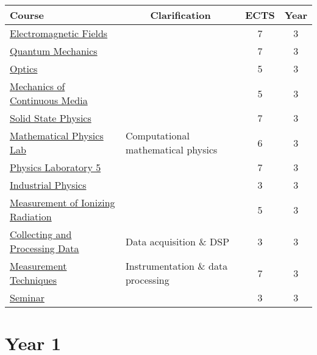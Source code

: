 \documentclass[11pt, a4paper]{article}
\begin{document}
\begin{table}[htb!]
\begin{tabular}{|l|l|c|c|}
    \hline {\rule{0pt}{2.0ex}} \hspace{-7pt}
    \textbf{Course} & \multicolumn{1}{c}{\textbf{Clarification}} & \textbf{ECTS} & \textbf{Year}\\
    \hline
    \hline {\rule{0pt}{2.5ex}} \hspace{-7pt}
    \hyperref[electromagnetic-fields]{Electromagnetic Fields} & & 7 & 3\\
    \hyperref[quantum-mechanics]{Quantum Mechanics} & & 7 & 3\\
    \hyperref[optics]{Optics} & & 5 & 3\\
    \hyperref[mechanics-of-continuous-media]{Mechanics of Continuous Media} & & 5 & 3\\
    \hyperref[solid-state-physics]{Solid State Physics} & & 7 & 3\\
    \hyperref[mathematical-physics-lab]{Mathematical Physics Lab} & Computational mathematical physics & 6 & 3\\
    \hyperref[physics-laboratory-5]{Physics Laboratory 5} & & 7 & 3\\
    \hyperref[industrial-physics]{Industrial Physics} & & 3 & 3\\
    \hyperref[measurement-of-ionizing-radiation]{Measurement of Ionizing Radiation} & & 5 & 3\\
    \hyperref[collecting-and-processing-data]{Collecting and Processing Data} & Data acquisition \& DSP & 3 & 3\\
    \hyperref[measurement-techniques]{Measurement Techniques} & Instrumentation \& data processing & 7 & 3\\
    \hyperref[seminar]{Seminar} & & 3 & 3\\
    \hline
\end{tabular}
\end{table}


\newpage
\pagestyle{fancy}
\section{Year 1}
\end{document}

